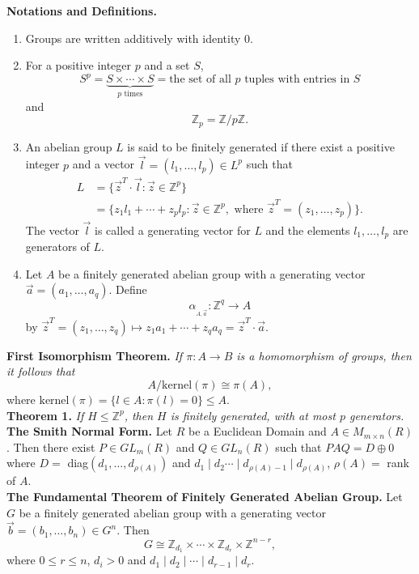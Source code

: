 \documentclass[9pt]{article}
\newcommand{\Z}{\mathbb{Z}}
\begin{document}
\noindent
\textbf{Notations and Definitions.}
\begin{enumerate}
   \item Groups are written additively with identity 0.
   \item For a positive integer $p$ and a set $S$,
         $$S^p = \underbrace{S \times \cdots \times S}_{p \text{ times}} =
           \text{the set of all $p$ tuples with entries in }S$$
         and
         $$\Z_p = \Z/p\Z.$$
   \item An abelian group $L$ is said to be finitely generated if there exist a
         positive integer $p$ and a vector
         $\vec{l} = (l_1, \ldots, l_p) \in L^p$ such that
         \begin{align*}
            L &= \{\vec{z}^T \cdot \vec{l} : \vec{z} \in \Z^p\} \\
              &= \{z_1l_1 + \cdots + z_pl_p : \vec{z} \in \Z^p, \text{ where }\vec{z}^T = (z_1, \ldots, z_p)\}.
         \end{align*}
         The vector $\vec{l}$ is called a generating vector for $L$ and the
         elements $l_1, \ldots, l_p$ are generators of $L$.
   \item Let $A$ be a finitely generated abelian group with a generating vector
         $\vec{a} = (a_1, \ldots, a_q)$. Define
         $$\alpha_{_{A, \vec{a}}} : \Z^q \rightarrow A$$
         by $\vec{z}^T = (z_1, \ldots, z_q) \mapsto z_1a_1 + \cdots + z_qa_q = \vec{z}^T \cdot \vec{a}$.
\end{enumerate}
\textbf{First Isomorphism Theorem.} \textit{If $\pi : A \rightarrow B$ is a
homomorphism of groups, then it follows that}
$$A/\text{kernel}(\pi)  \cong \pi(A),$$
where $\text{kernel}(\pi) = \{l \in A : \pi(l) = 0\} \le A$. \\

\noindent
\textbf{Theorem 1.} \textit{If $H \le \Z^p$, then $H$ is finitely generated,
with at most $p$ generators.} \\

\noindent
\textbf{The Smith Normal Form.} Let $R$ be a Euclidean Domain and
$A \in M_{m \times n}(R)$. Then there exist $P \in GL_m(R)$ and $Q \in GL_n(R)$
such that $PAQ = D \oplus 0$ where $D = $ diag$(d_1, \ldots, d_{\rho(A)})$ and
$d_1 \mid d_2 \cdots \mid d_{\rho(A)-1} \mid d_{\rho(A)}$, $\rho(A) =$
rank of $A$. \\

\noindent
\textbf{The Fundamental Theorem of Finitely Generated Abelian Group.} Let $G$ be
a finitely generated abelian group with a generating vector
$\vec{b} = (b_1, \ldots, b_n) \in G^n$. Then 
$$G \cong \Z_{d_1} \times \cdots \times \Z_{d_r} \times \Z^{n-r},$$
where $0 \le r \le n$, $d_i > 0$ and $d_1 \mid d_2 \mid \cdots \mid d_{r-1}
\mid d_r$. \\
\end{document}

